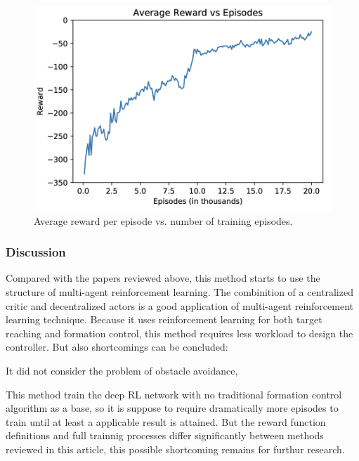 \begin{figure}
	\centering
	\includegraphics[width=5in]{mobilerobotrllearningcurve.png}
	\caption{Average reward per episode vs. number of training episodes.}
	\label{fig:mobilerobotrllearningcurve} 
\end{figure}

\subsubsection{Discussion}

Compared with the papers reviewed above, this method starts to use the structure of multi-agent reinforcement learning.
The combinition of a centralized critic and decentralized actors is a good application of multi-agent reinforcement learning technique.
Because it uses reinforcement learning for both target reaching and formation control, this method requires less workload to design the controller.
But also shortcomings can be concluded:

\begin{compactenum}
	\item It did not consider the problem of obstacle avoidance,
	\item This method train the deep RL network with no traditional formation control algorithm as a base, so it is suppose to require dramatically more episodes to train until at least a applicable result is attained. But the reward function definitions and full trainnig processes differ significantly between methods reviewed in this article, this possible shortcoming remains for furthur research.
\end{compactenum}
